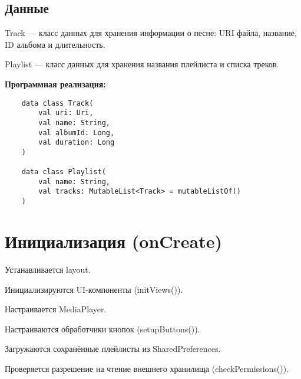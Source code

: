 \subsection{Данные}

Track — класс данных для хранения информации о песне: URI файла, название, ID альбома и длительность.

Playlist — класс данных для хранения названия плейлиста и списка треков.


\textbf{Программная реализация:}
\begin{verbatim}
	data class Track(
        val uri: Uri,
        val name: String,
        val albumId: Long,
        val duration: Long
    )

    data class Playlist(
        val name: String,
        val tracks: MutableList<Track> = mutableListOf()
    )
\end{verbatim}

\section{Инициализация (onCreate)}

Устанавливается layout.

Инициализируются UI-компоненты (initViews()).

Настраивается MediaPlayer.

Настраиваются обработчики кнопок (setupButtons()).

Загружаются сохранённые плейлисты из SharedPreferences.

Проверяется разрешение на чтение внешнего хранилища (checkPermissions()).


